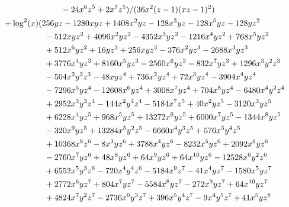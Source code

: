 \documentclass[letter,11pt,DIV=12,abstract=true,numbers=noenddot,titlepage=false,twocolumn=false,draft=false]{scrartcl}
\begin{document}
\begin{equation}
\begin{split}
      & \qquad \qquad \qquad \qquad - 24 x^6 z^5 + 2 x^7 z^5)/(36 x^2 (z-1) (x z-1)^2)\\
& \quad + \log^2(x) (256 y z - 1280 x y z + 1408 x^2 y z - 128 x^3 y z - 128 x^5 y z - 128 y z^2\\
      & \qquad \qquad \qquad - 512 x y z^2 + 4096 x^2 y z^2 - 4352 x^3 y z^2 - 1216 x^4 y z^2 + 768 x^5 y z^2\\
      & \qquad \qquad \qquad + 512 x^6 y z^2 + 16 y z^3 + 256 x y z^3 - 376 x^2 y z^3 - 2688 x^3 y z^3\\
      & \qquad \qquad \qquad + 3776 x^4 y z^3 + 8160 x^5 y z^3 - 2560 x^6 y z^3 - 832 x^7 y z^3 + 1296 x^3 y^2 z^3\\
      & \qquad \qquad \qquad - 504 x^2 y^3 z^3 - 48 x y z^4 + 736 x^2 y z^4 + 72 x^3 y z^4 - 3904 x^4 y z^4\\
      & \qquad \qquad \qquad - 7296 x^5 y z^4 - 12608 x^6 y z^4 + 3008 x^7 y z^4 + 704 x^8 y z^4 - 6480 x^4 y^2 z^4\\
      & \qquad \qquad \qquad + 2952 x^3 y^3 z^4 - 144 x^2 y^4 z^4 - 5184 x^7 z^5 + 40 x^2 y z^5 - 3120 x^3 y z^5\\
      & \qquad \qquad \qquad + 6228 x^4 y z^5 + 968 x^5 y z^5 + 13272 x^6 y z^5 + 6000 x^7 y z^5 - 1344 x^8 y z^5\\
      & \qquad \qquad \qquad - 320 x^9 y z^5 + 13284 x^5 y^2 z^5 - 6660 x^4 y^3 z^5 + 576 x^3 y^4 z^5\\
      & \qquad \qquad \qquad + 10368 x^8 z^6 - 8 x^3 y z^6 + 3788 x^4 y z^6 - 8232 x^5 y z^6 + 2092 x^6 y z^6\\
      & \qquad \qquad \qquad - 2760 x^7 y z^6 + 48 x^8 y z^6 + 64 x^9 y z^6 + 64 x^{10} y z^6 - 12528 x^6 y^2 z^6\\
      & \qquad \qquad \qquad + 6552 x^5 y^3 z^6 - 720 x^4 y^4 z^6 - 5184 x^9 z^7 - 41 x^4 y z^7 - 1580 x^5 y z^7\\
      & \qquad \qquad \qquad + 2772 x^6 y z^7 + 804 x^7 y z^7 - 5584 x^8 y z^7 - 272 x^9 y z^7 + 64 x^{10} y z^7\\
      & \qquad \qquad \qquad + 4824 x^7 y^2 z^7 - 2736 x^6 y^3 z^7 + 396 x^5 y^4 z^7 - 9 x^4 y^5 z^7 + 41 x^5 y z^8\\
\notag
\end{split}
\end{equation}
\end{document}

